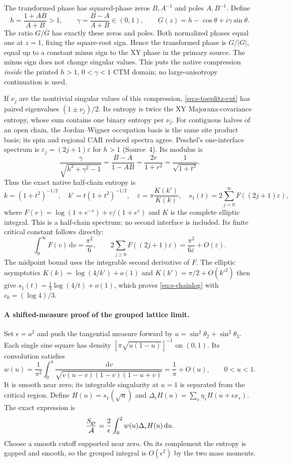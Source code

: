 \documentclass[10pt]{article}
\newcommand{\dd}{\,\mathrm d}
\begin{document}
The transformed phase has squared-phase zeros $B,A^{-1}$ and
poles $A,B^{-1}$. Define
\[
 h=\frac{1+AB}{A+B}>1,\qquad
 \gamma=\frac{B-A}{A+B}\in(0,1),\qquad
 G(z)=h-\cos\theta+i\gamma\sin\theta.
\]
The ratio $G/\overline G$ has exactly these zeros and poles.
Both normalized phases equal one at $z=1$, fixing the square-root
sign. Hence the transformed phase is $G/|G|$, equal up to a constant
minus sign to the XY phase in the primary source. The minus sign
does not change singular values. This puts the native compression
\emph{inside} the printed $h>1$, $0<\gamma<1$ CTM domain;
no large-anisotropy continuation is used.

If $\nu_j$ are the nontrivial singular values of this compression,
\eqref{eq:s-toeplitz-cut} has paired eigenvalues
$(1\pm\nu_j)/2$. Its entropy is twice the XY Majorana-covariance
entropy, whose sum contains one binary entropy per $\nu_j$.
For contiguous halves of an open chain, the Jordan--Wigner
occupation basis is the same site product basis; its spin and
regional CAR reduced spectra agree.
Peschel's one-interface spectrum is
$\varepsilon_j=(2j+1)\varepsilon$ for $h>1$ (Source~4).
Its modulus is
\[
 \frac{\gamma}{\sqrt{h^2+\gamma^2-1}}
 =\frac{B-A}{1-AB}=\frac{2r}{1+r^2}
 =\frac1{\sqrt{1+t^2}}.
\]
Thus the exact native half-chain entropy is
\begin{equation}
 k=(1+t^2)^{-1/2},\quad k'=t(1+t^2)^{-1/2},\quad
 \varepsilon=\pi\frac{K(k')}{K(k)},\quad
 s_1(t)=2\sum_{j=0}^{\infty}F((2j+1)\varepsilon),
 \label{eq:s-ctm}
\end{equation}
where $F(v)=\log(1+e^{-v})+v/(1+e^v)$ and $K$ is the complete
elliptic integral. This is a half-chain spectrum: no second interface
is included. Its finite critical constant follows directly:
\[
 \int_0^\infty F(v)\dd v=\frac{\pi^2}{6},\qquad
 2\sum_{j\ge0}F((2j+1)\varepsilon)
 =\frac{\pi^2}{6\varepsilon}+O(\varepsilon).
\]
The midpoint bound uses the integrable second derivative of $F$.
The elliptic asymptotics $K(k)=\log(4/k')+o(1)$ and
$K(k')=\pi/2+O(k'^2)$ then give
$s_1(t)=\tfrac13\log(4/t)+o(1)$, which proves
\eqref{eq:s-chainlog} with $c_0=(\log4)/3$.

\paragraph{A shifted-measure proof of the grouped lattice limit.}
Set $\epsilon=a^2$ and push the tangential
measure forward by $u=\sin^2\theta_2+\sin^2\theta_3$. Each
single sine square has density
$[\pi\sqrt{u(1-u)}]^{-1}$ on $(0,1)$. Its convolution satisfies
\begin{equation}
 w(u)=\frac1{\pi^2}\int_0^u
 \frac{\dd v}{\sqrt{v(u-v)(1-v)(1-u+v)}}
 =\frac1\pi+O(u),\qquad 0<u<1.
 \label{eq:s-density}
\end{equation}
It is smooth near zero; its integrable singularity at $u=1$
is separated from the critical region. Define
$H(u)=s_1(\sqrt u)$ and
$\Delta_\epsilon H(u)=\sum_s\eta_sH(u+\epsilon x_s)$.
The exact expression is
\[
 \frac{S_{\rm gr}}{\mathcal A}
 =\frac2\epsilon\int_0^2w(u)\Delta_\epsilon H(u)\dd u.
\]
Choose a smooth cutoff supported near zero. On its complement
the entropy is gapped and smooth, so the grouped integral is
$O(\epsilon^2)$ by the two mass moments.
\end{document}
